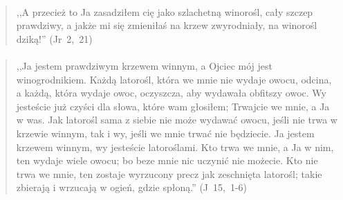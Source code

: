 \documentclass[10pt,a4paper,oneside]{article}
\begin{document}
\paragraph{}
\begin{quote}
,,A przecież to Ja zasadziłem cię jako szlachetną winorośl, cały szczep prawdziwy, a jakże mi się zmieniłaś na krzew zwyrodniały, na winorośl dziką!'' \mbox{(Jr 2, 21)}
\end{quote}
\paragraph{}
\begin{quote}
,,Ja jestem prawdziwym krzewem winnym, a Ojciec mój jest winogrodnikiem. Każdą latorośl, która we mnie nie wydaje owocu, odcina, a każdą, która wydaje owoc, oczyszcza, aby wydawała obfitszy owoc. Wy jesteście już czyści dla słowa, które wam głosiłem; Trwajcie we mnie, a Ja w was. Jak latorośl sama z siebie nie może wydawać owocu, jeśli nie trwa w krzewie winnym, tak i wy, jeśli we mnie trwać nie będziecie. Ja jestem krzewem winnym, wy jesteście latoroślami. Kto trwa we mnie, a Ja w nim, ten wydaje wiele owocu; bo beze mnie nic uczynić nie możecie. Kto nie trwa we mnie, ten zostaje wyrzucony precz jak zeschnięta latorośl; takie zbierają i wrzucają w ogień, gdzie spłoną.'' \mbox{(J 15, 1-6)}
\end{quote}
\end{document}
